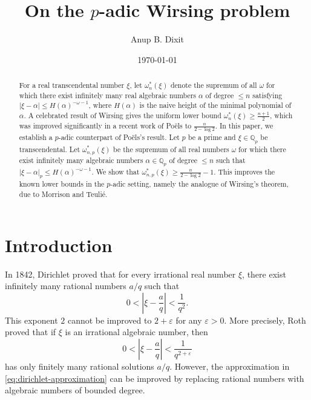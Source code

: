 \documentclass[12pt,reqno]{amsart}
\title[On the $p$-adic Wirsing problem]{On the $p$-adic Wirsing problem}
\author{Anup B. Dixit}
\date{\today}
\theoremstyle{definition}
\theoremstyle{remark}
\newcommand{\Qp}{\mathbb Q_p}
\begin{document}
\begin{abstract}
For a real transcendental number $\xi$, let $\omega_n^*(\xi)$ denote the supremum of all $\omega$ for which there exist infinitely many real algebraic numbers $\alpha$ of degree $\leq n$ satisfying $|\xi-\alpha|\leq H(\alpha)^{-\omega -1}$, where $H(\alpha)$ is the naive height of the minimal polynomial of $\alpha$. A celebrated result of Wirsing gives the uniform lower bound $\omega_n^*(\xi)\geq\frac{n+1}{2}$, which was improved significantly in a recent work of Po\"els to $\frac{n}{2-\log 2}$. In this paper, we establish a $p$-adic counterpart of Po\"els's result. Let $p$ be a prime and $\xi\in\Qp$ be transcendental. Let $\omega_{n,p}^*(\xi)$ be the supremum of all real numbers $\omega$ for which there exist infinitely many algebraic numbers $\alpha \in \Qp$ of degree $\leq n$ such that $|\xi-\alpha|_p\leq H(\alpha)^{-\omega -1}$. We show that $\omega^*_{n,p}(\xi)\geq\frac{n}{2-\log 2}-1$. This improves the known lower bounds in the $p$-adic setting, namely the analogue of Wirsing's theorem, due to Morrison and Teuli\'e.
\end{abstract}


\maketitle

\bigskip
\section{\bf Introduction}
\bigskip
In 1842, Dirichlet \cite{Dirichlet} proved that for every irrational real
number $\xi$, there exist infinitely many rational numbers $a/q$ such that
\begin{equation}\label{eq:dirichlet-approximation}
0<\left|\xi-\frac aq\right|<\frac1{q^2}.
\end{equation}
This exponent $2$ cannot be improved to $2+\varepsilon$ for any
$\varepsilon>0$. More precisely, Roth \cite{Roth} proved that if $\xi$ is an
irrational algebraic number, then
$$
0<\left|\xi-\frac aq\right|<\frac1{q^{2+\varepsilon}}
$$
has only finitely many rational solutions $a/q$. However, the approximation
in \eqref{eq:dirichlet-approximation} can be improved by replacing
rational numbers with algebraic numbers of bounded degree.\\
\end{document}
